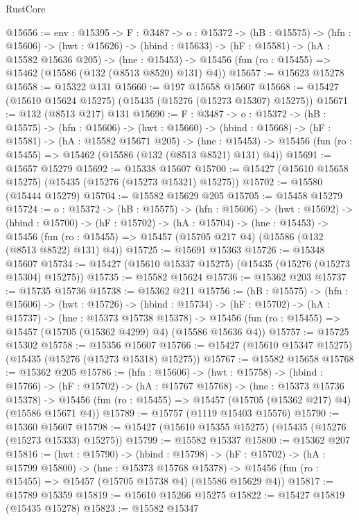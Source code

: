 \begin{lexlean}{RustCore}
\begin{coremodule}
@15656 := {env : @15395} ->
  {F : @3487} ->
  {o : @15372} ->
  (hB : @15575) ->
  (hfn : @15606) ->
  (hwt : @15626) ->
  (hbind : @15633) ->
  (hF : @15581) ->
  (hA : @15582 @15636 @205) ->
  (hne : @15453) -> @15456 (fun (ro : @15455) => @15462 (@15586 (@132 (@8513 @8520) @131) @4))
@15657 := @15623 @15278
@15658 := @15322 @131
@15660 := @197 @15658 @15607
@15668 := @15427 (@15610 @15624 @15275) (@15435 (@15276 (@15273 @15307) @15275))
@15671 := @132 (@8513 @217) @131
@15690 := {F : @3487} ->
  {o : @15372} ->
  (hB : @15575) ->
  (hfn : @15606) ->
  (hwt : @15660) ->
  (hbind : @15668) ->
  (hF : @15581) ->
  (hA : @15582 @15671 @205) ->
  (hne : @15453) -> @15456 (fun (ro : @15455) => @15462 (@15586 (@132 (@8513 @8521) @131) @4))
@15691 := @15657 @15279
@15692 := @15338 @15607
@15700 := @15427 (@15610 @15658 @15275) (@15435 (@15276 (@15273 @15321) @15275))
@15702 := @15580 (@15444 @15279)
@15704 := @15582 @15629 @205
@15705 := @15458 @15279
@15724 := {o : @15372} ->
  (hB : @15575) ->
  (hfn : @15606) ->
  (hwt : @15692) ->
  (hbind : @15700) ->
  (hF : @15702) ->
  (hA : @15704) ->
  (hne : @15453) ->
  @15456 (fun (ro : @15455) => @15457 (@15705 @217 @4) (@15586 (@132 (@8513 @8522) @131) @4))
@15725 := @15691 @15363
@15726 := @15348 @15607
@15734 := @15427 (@15610 @15337 @15275) (@15435 (@15276 (@15273 @15304) @15275))
@15735 := @15582 @15624
@15736 := @15362 @203
@15737 := @15735 @15736
@15738 := @15362 @211
@15756 := (hB : @15575) ->
  (hfn : @15606) ->
  (hwt : @15726) ->
  (hbind : @15734) ->
  (hF : @15702) ->
  (hA : @15737) ->
  (hne : @15373 @15738 @15378) ->
  @15456 (fun (ro : @15455) => @15457 (@15705 (@15362 @4299) @4) (@15586 @15636 @4))
@15757 := @15725 @15302
@15758 := @15356 @15607
@15766 := @15427 (@15610 @15347 @15275) (@15435 (@15276 (@15273 @15318) @15275))
@15767 := @15582 @15658
@15768 := @15362 @205
@15786 := (hfn : @15606) ->
  (hwt : @15758) ->
  (hbind : @15766) ->
  (hF : @15702) ->
  (hA : @15767 @15768) ->
  (hne : @15373 @15736 @15378) ->
  @15456 (fun (ro : @15455) => @15457 (@15705 (@15362 @217) @4) (@15586 @15671 @4))
@15789 := @15757 (@1119 @15403 @15576)
@15790 := @15360 @15607
@15798 := @15427 (@15610 @15355 @15275) (@15435 (@15276 (@15273 @15333) @15275))
@15799 := @15582 @15337
@15800 := @15362 @207
@15816 := (hwt : @15790) ->
  (hbind : @15798) ->
  (hF : @15702) ->
  (hA : @15799 @15800) ->
  (hne : @15373 @15768 @15378) ->
  @15456 (fun (ro : @15455) => @15457 (@15705 @15738 @4) (@15586 @15629 @4))
@15817 := @15789 @15359
@15819 := @15610 @15266 @15275
@15822 := @15427 @15819 (@15435 @15278)
@15823 := @15582 @15347

\end{coremodule}
\end{lexlean}
